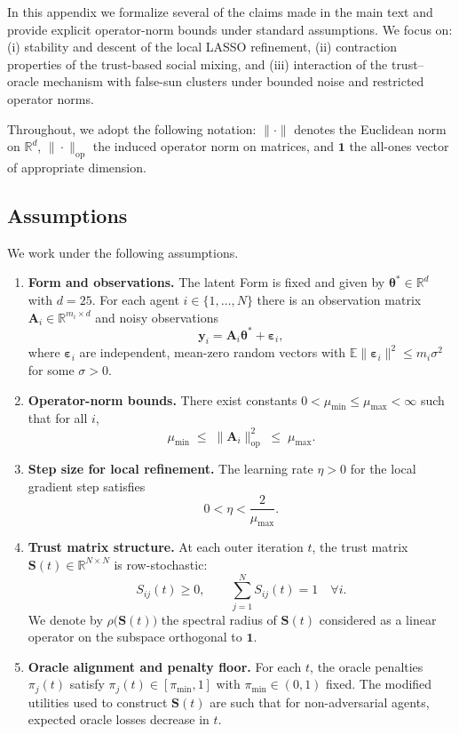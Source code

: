 \documentclass[11pt]{article}
\begin{document}
In this appendix we formalize several of the claims made in the main
text and provide explicit operator-norm bounds under standard
assumptions.
We focus on:
(i) stability and descent of the local LASSO refinement,
(ii) contraction properties of the trust-based social mixing,
and (iii) interaction of the trust–oracle mechanism with false-sun
clusters under bounded noise and restricted operator norms.

Throughout, we adopt the following notation:
$\|\cdot\|$ denotes the Euclidean norm on $\mathbb{R}^d$,
$\|\cdot\|_{\mathrm{op}}$ the induced operator norm on matrices,
and $\bm{1}$ the all-ones vector of appropriate dimension.

\subsection{Assumptions}

We work under the following assumptions.

\begin{enumerate}[label=(A\arabic*),noitemsep]
  \item \textbf{Form and observations.}
    The latent Form is fixed and given by
    $\bm{\theta}^* \in \mathbb{R}^{d}$ with $d=25$.
    For each agent $i \in \{1,\dots,N\}$ there is an observation matrix
    $\bm{A}_i \in \mathbb{R}^{m_i \times d}$ and noisy observations
    \[
      \bm{y}_i = \bm{A}_i \bm{\theta}^* + \bm{\varepsilon}_i,
    \]
    where $\bm{\varepsilon}_i$ are independent, mean-zero random
    vectors with
    $\mathbb{E}\|\bm{\varepsilon}_i\|^2 \leq m_i \sigma^2$ for some
    $\sigma > 0$.

  \item \textbf{Operator-norm bounds.}
    There exist constants $0 < \mu_{\min} \leq \mu_{\max} < \infty$
    such that for all $i$,
    \[
      \mu_{\min}
      \;\leq\;
      \|\bm{A}_i\|_{\mathrm{op}}^2
      \;\leq\;
      \mu_{\max}.
    \]

  \item \textbf{Step size for local refinement.}
    The learning rate $\eta > 0$ for the local gradient step satisfies
    \[
      0 < \eta < \frac{2}{\mu_{\max}}.
    \]

  \item \textbf{Trust matrix structure.}
    At each outer iteration $t$, the trust matrix
    $\bm{S}(t) \in \mathbb{R}^{N \times N}$ is row-stochastic:
    \[
      S_{ij}(t) \geq 0,
      \qquad
      \sum_{j=1}^N S_{ij}(t) = 1 \quad \forall i.
    \]
    We denote by
    $\rho\bigl(\bm{S}(t)\bigr)$ the spectral radius of $\bm{S}(t)$
    considered as a linear operator on the subspace orthogonal to
    $\bm{1}$.

  \item \textbf{Oracle alignment and penalty floor.}
    For each $t$, the oracle penalties $\pi_j(t)$ satisfy
    $\pi_j(t) \in [\pi_{\min},1]$ with $\pi_{\min} \in (0,1)$ fixed.
    The modified utilities used to construct $\bm{S}(t)$ are such that
    for non-adversarial agents, expected oracle losses decrease in $t$.
\end{enumerate}
\end{document}

